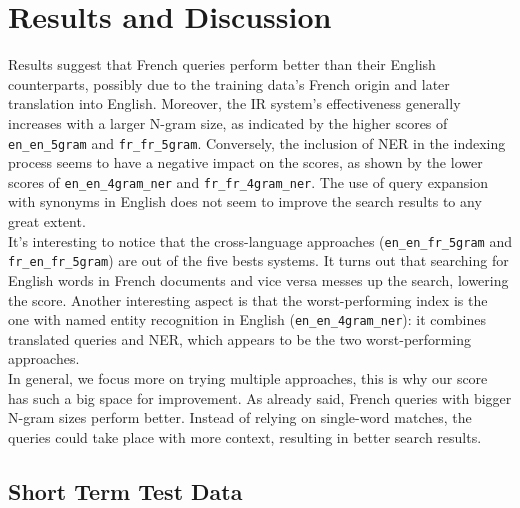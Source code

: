 \newpage
\section{Results and Discussion}
\label{sec:results}

Results suggest that French queries perform better than their English counterparts, possibly due to the training data's
French origin and later translation into English.
Moreover, the IR system's effectiveness generally increases with a larger N-gram size, as indicated by the higher scores
of \texttt{en\_en\_5gram} and \texttt{fr\_fr\_5gram}.
Conversely, the inclusion of NER in the indexing process seems to have a negative impact on the scores, as shown by the
lower scores of \texttt{en\_en\_4gram\_ner} and \texttt{fr\_fr\_4gram\_ner}.
The use of query expansion with synonyms in English does not seem to improve the search results to any great extent.\\

It's interesting to notice that the cross-language approaches (\texttt{en\_en\_fr\_5gram} and
\texttt{fr\_en\_fr\_5gram}) are out of the five bests systems.
It turns out that searching for English words in French documents and vice versa messes up the search, lowering the
score.
Another interesting aspect is that the worst-performing index is the one with named entity recognition in English
(\texttt{en\_en\_4gram\_ner}): it combines translated queries and NER, which appears to be the two worst-performing
approaches.\\

In general, we focus more on trying multiple approaches, this is why our score has such a big space for improvement.
As already said, French queries with bigger N-gram sizes perform better.
Instead of relying on single-word matches, the queries could take place with more context, resulting in better search
results.\\

\subsection{Short Term Test Data}\label{subsec:short_term}

